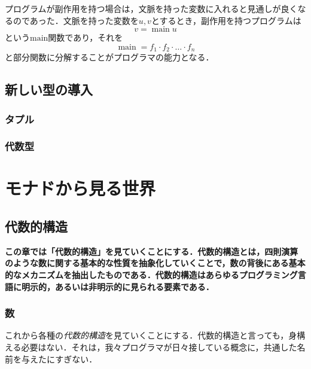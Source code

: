 \documentclass[twocolumn]{jsbook}
\newcommand{\keyword}[1]{{\emph{#1}}}
\newenvironment{leader}{\begingroup\bf}{\endgroup}
\DeclareMathOperator{\hsklFmap}{\cdot}
\DeclareMathOperator{\mathMain}{main}
\begin{document}
プログラムが副作用を持つ場合は，文脈を持った変数に入れると見通しが良くなるのであった．文脈を持った変数を$u,v$とするとき，副作用を持つプログラムは
\begin{equation}
v=\mathMain u
\end{equation}
という$\text{main}$関数であり，それを
\begin{equation}
\mathMain=f_1\hsklFmap f_2\hsklFmap\dots\hsklFmap f_n
\end{equation}
と部分関数に分解することがプログラマの能力となる．

\chapter{新しい型の導入}

\section{タプル}

\section{代数型}



\part{モナドから見る世界}

\chapter{代数的構造}

\begin{leader}
この章では「代数的構造」を見ていくことにする．代数的構造とは，四則演算のような数に関する基本的な性質を抽象化していくことで，数の背後にある基本的なメカニズムを抽出したものである．代数的構造はあらゆるプログラミング言語に明示的，あるいは非明示的に見られる要素である．
\end{leader}

\section{数}

これから各種の\keyword{代数的構造}を見ていくことにする．代数的構造と言っても，身構える必要はない．それは，我々プログラマが日々接している概念に，共通した名前を与えたにすぎない．
\end{document}
